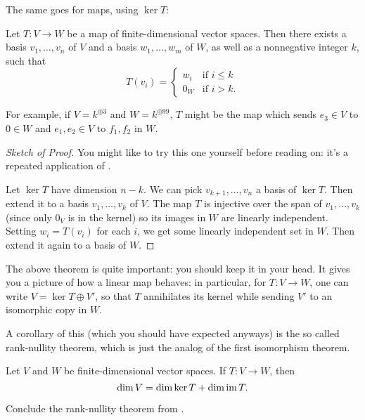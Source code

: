 The same goes for maps, using $\ker T$:
\begin{theorem}
	\label{thm:linear_map_basis}
	Let $T \colon V \to W$ be a map of finite-dimensional vector spaces.
	Then there exists a basis $v_1, \dots, v_n$ of $V$
	and a basis $w_1, \dots, w_m$ of $W$,
	as well as a nonnegative integer $k$, such that
	\[
		T(v_i) =
		\begin{cases}
			w_i & \text{if $i \le k$} \\
			0_W & \text{if $i > k$}.
		\end{cases}
	\]
\end{theorem}
For example, if $V = k^{\oplus 3}$ and $W = k^{\oplus 99}$,
$T$ might be the map which sends $e_3 \in V$ to $0 \in W$
and $e_1, e_2 \in V$ to $f_{1}, f_{2}$ in $W$.
\begin{proof}[Sketch of Proof]
	You might like to try this one yourself before reading on:
	it's a repeated application of .

	Let $\ker T$ have dimension $n-k$.
	We can pick $v_{k+1}, \dots, v_{n}$ a basis of $\ker T$.
	Then extend it to a basis $v_1, \dots, v_k$ of $V$.
	The map $T$ is injective over the span of $v_1, \dots, v_k$
	(since only $0_V$ is in the kernel) so its images in $W$ are linearly independent.
	Setting $w_i = T(v_i)$ for each $i$,
	we get some linearly independent set in $W$.
	Then extend it again to a basis of $W$.
\end{proof}

The above theorem is quite important: you should keep it in your head.
It gives you a picture of how a linear map behaves:
in particular, for $T \colon V \to W$,
one can write $V = \ker T \oplus V'$,
so that $T$ annihilates its kernel while sending $V'$
to an isomorphic copy in $W$.

A corollary of this (which you should have expected anyways) is the so called rank-nullity theorem,
which is just the analog of the first isomorphism theorem.
\begin{theorem}
	\label{thm:rank_nullity}
	Let $V$ and $W$ be finite-dimensional vector spaces.
	If $T : V \to W$, then
	\[ \dim V = \dim \ker T + \dim \operatorname{im} T. \]
\end{theorem}
\begin{ques}
	Conclude the rank-nullity theorem from .
\end{ques}


